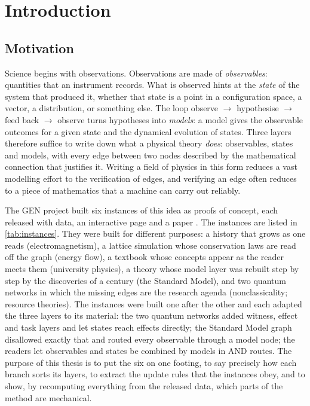 \documentclass[11pt,a4paper,twoside,openany]{report}
\theoremstyle{plain}
\theoremstyle{definition}
\theoremstyle{remark}
\begin{document}
\chapter{Introduction}\label{ch:intro}

\section{Motivation}
Science begins with observations. Observations are made of \emph{observables}: quantities that an instrument records. What is observed hints at the \emph{state} of the system that produced it, whether that state is a point in a configuration space, a vector, a distribution, or something else. The loop observe $\to$ hypothesise $\to$ feed back $\to$ observe turns hypotheses into \emph{models}: a model gives the observable outcomes for a given state and the dynamical evolution of states. Three layers therefore suffice to write down what a physical theory \emph{does}: observables, states and models, with every edge between two nodes described by the mathematical connection that justifies it. Writing a field of physics in this form reduces a vast modelling effort to the verification of edges, and verifying an edge often reduces to a piece of mathematics that a machine can carry out reliably.

The GEN project built six instances of this idea as proofs of concept, each released with data, an interactive page and a paper \citep{gen_em,gen_lg,gen_learning,gen_hep,gen_gpt,gen_qrt,gen_combined}. The instances are listed in \cref{tab:instances}. They were built for different purposes: a history that grows as one reads (electromagnetism), a lattice simulation whose conservation laws are read off the graph (energy flow), a textbook whose concepts appear as the reader meets them (university physics), a theory whose model layer was rebuilt step by step by the discoveries of a century (the Standard Model), and two quantum networks in which the missing edges are the research agenda (nonclassicality; resource theories). The instances were built one after the other and each adapted the three layers to its material: the two quantum networks added witness, effect and task layers and let states reach effects directly; the Standard Model graph disallowed exactly that and routed every observable through a model node; the readers let observables and states be combined by models in AND routes. The purpose of this thesis is to put the six on one footing, to say precisely how each branch sorts its layers, to extract the update rules that the instances obey, and to show, by recomputing everything from the released data, which parts of the method are mechanical.
\end{document}
